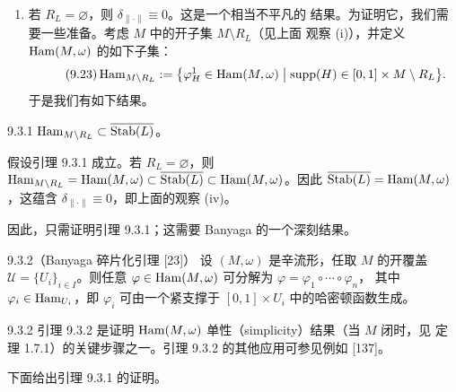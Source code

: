 \begin{enumerate}[label=(\roman*),start=4]
  \item 若 $R_L=\varnothing$，则 $\delta_{\|\cdot\|}\equiv0$。这是一个相当不平凡的
    结果。为证明它，我们需要一些准备。考虑 $M$ 中的开子集 $M\setminus R_L$（见上面
    观察 (i)），并定义 $\operatorname{Ham}(M,\omega)$ 的如下子集：
    \begin{equation}\tag{9.23}
      \operatorname{Ham}_{M\setminus R_L}:=\bigl\{\varphi_H^1\in\operatorname{Ham}(M,\omega)\bigm|
      \operatorname{supp}(H)\in[0,1]\times M\setminus R_L\bigr\}.
    \end{equation}
    于是我们有如下结果。
\end{enumerate}

\begin{wlem}{9.3.1}
  $\operatorname{Ham}_{M\setminus R_L}\subset\overline{\operatorname{Stab}(L)}$。
\end{wlem}

假设引理 9.3.1 成立。若 $R_L=\varnothing$，则
$\operatorname{Ham}_{M\setminus R_L}=\operatorname{Ham}(M,\omega)\subset\overline{\operatorname{Stab}(L)}
\subset\operatorname{Ham}(M,\omega)$。因此
$\overline{\operatorname{Stab}(L)}=\operatorname{Ham}(M,\omega)$，这蕴含
$\delta_{\|\cdot\|}\equiv0$，即上面的观察 (iv)。

因此，只需证明引理 9.3.1；这需要 Banyaga 的一个深刻结果。

\begin{wlem}{9.3.2}（Banyaga 碎片化引理 [23]）
  设 $(M,\omega)$ 是辛流形，任取 $M$ 的开覆盖 $\mathcal U=\{U_i\}_{i\in I}$。则任意
  $\varphi\in\operatorname{Ham}(M,\omega)$ 可分解为 $\varphi=\varphi_1\circ\cdots\circ\varphi_n$，
  其中 $\varphi_i\in\operatorname{Ham}_{U_i}$，即 $\varphi_i$ 可由一个紧支撑于 $[0,1]\times U_i$
  中的哈密顿函数生成。
\end{wlem}

\begin{wrem}{9.3.2}
  引理 9.3.2 是证明 $\operatorname{Ham}(M,\omega)$ 单性（simplicity）结果（当 $M$ 闭时，见
  定理 1.7.1）的关键步骤之一。引理 9.3.2 的其他应用可参见例如 [137]。
\end{wrem}

下面给出引理 9.3.1 的证明。
